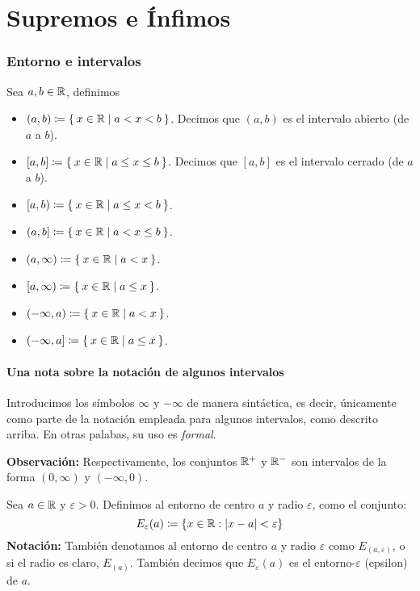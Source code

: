 \part*{Supremos e Ínfimos}

\section*{Entorno e intervalos}

  Sea $a, b\in \mathbb{R}$, definimos
\begin{itemize}
 \item $(a,b)\coloneqq \Set{x\in \mathbb{R}| a<x<b}$. Decimos que $(a,b)$ es el intervalo abierto (de $a$ a $b$).
 \item $[a,b]\coloneqq \Set{x\in \mathbb{R}|a\leq x\leq b}$. Decimos que $[a, b]$ es el intervalo cerrado (de $a$ a $b$).
 \item $[a,b)\coloneqq \Set{x\in \mathbb{R}|a\leq x <b}$.
 \item $(a,b]\coloneqq \Set{x\in \mathbb{R}|a<x\leq b}$.
 \item $(a, \infty)\coloneqq \Set{x\in \mathbb{R}| a<x}$.
 \item $[a, \infty) \coloneqq \Set{x\in \mathbb{R}| a\leq x}$.
 \item $(-\infty, a) \coloneqq \Set{x\in \mathbb{R}|a<x}$.
 \item $(-\infty, a] \coloneqq \Set{x\in \mathbb{R}|a\leq x}$.
\end{itemize}

\subsection*{Una nota sobre la notación de algunos intervalos}

Introducimos los símbolos $\infty$ y $-\infty$ de manera sintáctica, es decir, únicamente como parte de la notación empleada para algunos intervalos, como descrito arriba. En otras palabas, su uso es \textit{formal}.

\textbf{Observación:} Respectivamente, los conjuntos $\mathbb{R}^+$ y $\mathbb{R}^-$ son intervalos de la forma $(0, \infty)$ y $(-\infty, 0)$.

 Sea $a \in \mathbb{R}$ y $\varepsilon>0$. Definimos al entorno de centro $a$ y radio $\varepsilon$, como el conjunto: \[E_\varepsilon(a)\coloneqq \{ x\in \mathbb{R}: |x-a|<\varepsilon\}\]
\textbf{Notación:} También denotamos al entorno de centro $a$ y radio $\varepsilon$ como $E_{(a, \varepsilon)}$, o si el radio es claro, $E_{(a)}$. También decimos que $E_\varepsilon(a)$ es el entorno-$\varepsilon$ (epsilon) de $a$.

